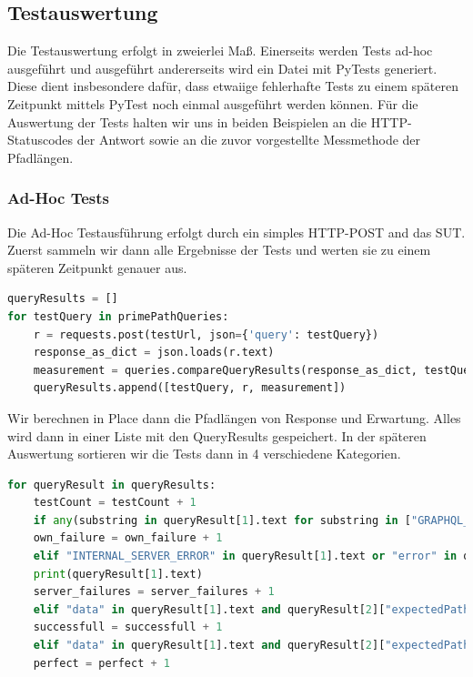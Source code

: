 \subsection{Testauswertung}

Die Testauswertung erfolgt in zweierlei Maß.
Einerseits werden Tests ad-hoc ausgeführt und ausgeführt andererseits wird ein Datei mit PyTests generiert.
Diese dient insbesondere dafür, dass etwaiige fehlerhafte Tests zu einem späteren Zeitpunkt mittels PyTest noch einmal ausgeführt werden können.
Für die Auswertung der Tests halten wir uns in beiden Beispielen an die HTTP-Statuscodes der Antwort sowie an die zuvor vorgestellte Messmethode
der Pfadlängen.

\subsubsection{Ad-Hoc Tests}

Die Ad-Hoc Testausführung erfolgt durch ein simples HTTP-POST and das SUT.
Zuerst sammeln wir dann alle Ergebnisse der Tests und werten sie zu einem späteren Zeitpunkt genauer aus.

\begin{lstlisting}[language=Python]
queryResults = []
for testQuery in primePathQueries:
    r = requests.post(testUrl, json={'query': testQuery})
    response_as_dict = json.loads(r.text)
    measurement = queries.compareQueryResults(response_as_dict, testQuery)
    queryResults.append([testQuery, r, measurement])
\end{lstlisting}

Wir berechnen in Place dann die Pfadlängen von Response und Erwartung.
Alles wird dann in einer Liste mit den QueryResults gespeichert.
In der späteren Auswertung sortieren wir die Tests dann in 4 verschiedene Kategorien.

\begin{lstlisting}[language=Python]
for queryResult in queryResults:
    testCount = testCount + 1
    if any(substring in queryResult[1].text for substring in ["GRAPHQL_PARSE_FAILED", "GRAPHQL_VALIDATION_FAILED"]):
    own_failure = own_failure + 1
    elif "INTERNAL_SERVER_ERROR" in queryResult[1].text or "error" in queryResult[1].text:
    print(queryResult[1].text)
    server_failures = server_failures + 1
    elif "data" in queryResult[1].text and queryResult[2]["expectedPathLength"] > queryResult[2]["pathLengthFromResult"]:
    successfull = successfull + 1
    elif "data" in queryResult[1].text and queryResult[2]["expectedPathLength"] == queryResult[2]["pathLengthFromResult"]:
    perfect = perfect + 1
\end{lstlisting}

